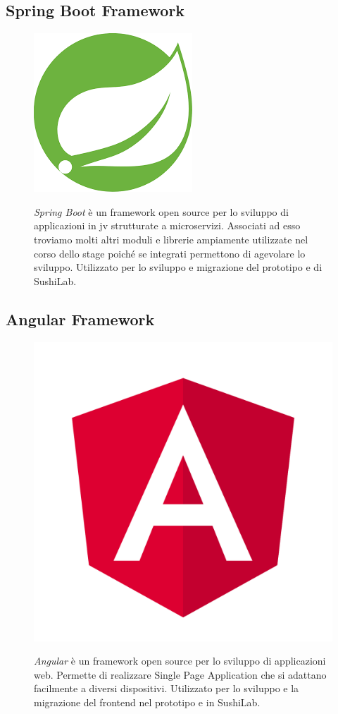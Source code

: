\subsection*{Spring Boot Framework}
\FloatBarrier
\begin{figure}[!h]
  \begin{minipage}[h]{0.3\linewidth}
    \centering
    \includegraphics[width=0.4\linewidth]{immagini/spring.png}
  \end{minipage}
  \begin{minipage}[!h]{0.7\linewidth}
    \textit{Spring Boot} è un framework open source per lo sviluppo di applicazioni in \gls{jv} strutturate a microservizi. Associati ad esso troviamo molti altri moduli e librerie ampiamente utilizzate nel corso dello stage poiché se integrati permettono di agevolare lo sviluppo. Utilizzato per lo sviluppo e migrazione del prototipo e di SushiLab.
  \end{minipage}
\end{figure}
\FloatBarrier
\subsection*{Angular Framework}
\FloatBarrier
\begin{figure}[!h]
  \begin{minipage}[h]{0.3\linewidth}
    \centering
    \includegraphics[width=0.5\linewidth]{immagini/angular.png}
  \end{minipage}
  \begin{minipage}[!h]{0.7\linewidth}
    \textit{Angular} è un framework open source per lo sviluppo di applicazioni web. Permette di realizzare Single Page Application che si adattano facilmente a diversi dispositivi. Utilizzato per lo sviluppo e la migrazione del frontend nel prototipo e in SushiLab.
  \end{minipage}
\end{figure}
\FloatBarrier
